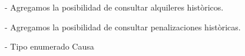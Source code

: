 - Agregamos la posibilidad de consultar alquileres històricos.

- Agregamos la posibilidad de consultar penalizaciones històricas.

- Tipo enumerado Causa

